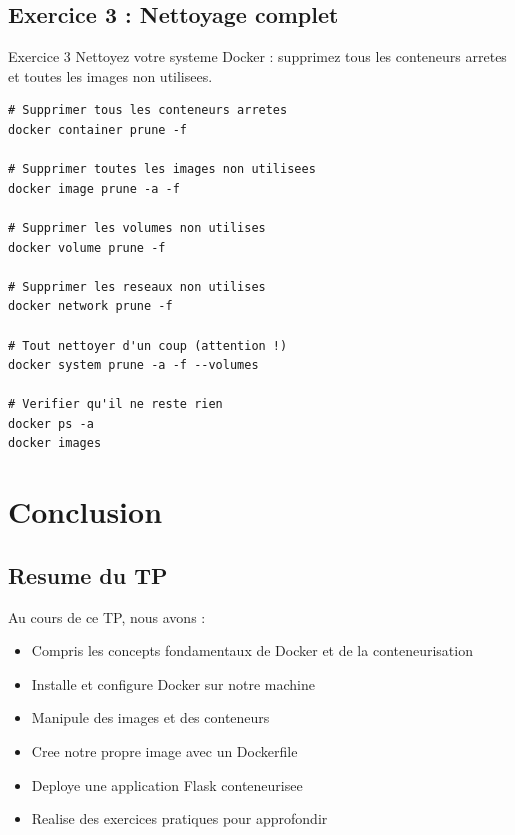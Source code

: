 \documentclass[a4paper,12pt]{article}
\begin{document}
\subsection{Exercice 3 : Nettoyage complet}
\begin{importantbox}{Exercice 3}
Nettoyez votre systeme Docker : supprimez tous les conteneurs arretes et toutes les images non utilisees.
\end{importantbox}
\begin{lstlisting}[caption=Correction]
# Supprimer tous les conteneurs arretes
docker container prune -f

# Supprimer toutes les images non utilisees
docker image prune -a -f

# Supprimer les volumes non utilises
docker volume prune -f

# Supprimer les reseaux non utilises
docker network prune -f

# Tout nettoyer d'un coup (attention !)
docker system prune -a -f --volumes

# Verifier qu'il ne reste rien
docker ps -a
docker images
\end{lstlisting}

\section{Conclusion}

\subsection{Resume du TP}
Au cours de ce TP, nous avons :
\begin{itemize}
    \item Compris les concepts fondamentaux de Docker et de la conteneurisation
    \item Installe et configure Docker sur notre machine
    \item Manipule des images et des conteneurs
    \item Cree notre propre image avec un Dockerfile
    \item Deploye une application Flask conteneurisee
    \item Realise des exercices pratiques pour approfondir
\end{itemize}
\end{document}

